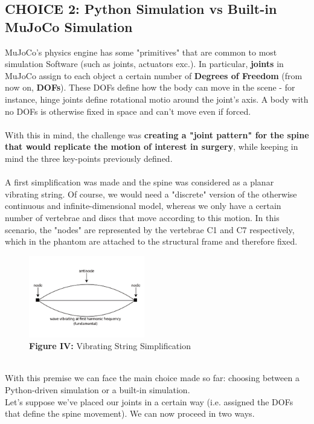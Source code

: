 \documentclass[a4paper, 12pt]{article}
\def\FigureFour{\centering\includegraphics[width=0.45\textwidth]{Figures/fig04.pdf}}
\begin{document}
\subsection{CHOICE 2: Python Simulation vs Built-in MuJoCo Simulation}
MuJoCo's physics engine has some "primitives" that are common to most simulation Software (such as joints, actuators exc.). In particular, \textbf{joints} in MuJoCo assign to each object a certain number of \textbf{Degrees of Freedom} (from now on, \textbf{DOFs}). These DOFs define how the body can move in the scene - for instance, hinge joints define rotational motio around the joint's axis. A body with no DOFs is otherwise fixed in space and can't move even if forced.
\\\\ With this in mind, the challenge was \textbf{creating a "joint pattern" for the spine that would replicate the motion of interest in surgery}, while keeping in mind the three key-points previously defined. 
\\\\A first simplification was made and the spine was considered as a planar vibrating string. Of course, we would need a "discrete" version of the otherwise continuous and infinite-dimensional model, whereas we only have a certain number of vertebrae and discs that move according to this motion. In this scenario, the "nodes" are represented by the vertebrae C1 and C7 respectively, which in the phantom are attached to the structural frame and therefore fixed.
\begin{figure}[h!]
    \FigureFour
    \caption*{\textbf{Figure IV:} Vibrating String Simplification}
    \label{fig:fig04}
\end{figure} 
\\
With this premise we can face the main choice made so far: choosing between a Python-driven simulation or a built-in simulation.
\\
Let's suppose we've placed our joints in a certain way (i.e. assigned the DOFs that define the spine movement). We can now proceed in two ways. 
\end{document}
